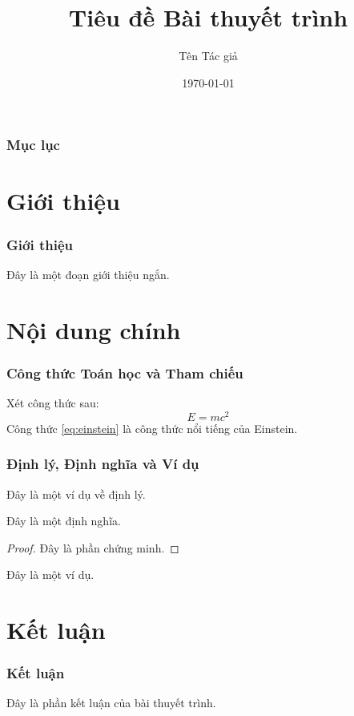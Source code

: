 \documentclass{beamer}
\begin{document}
\title{Tiêu đề Bài thuyết trình}
\author{Tên Tác giả}
\date{\today}

\begin{frame}
    \titlepage
\end{frame}

\begin{frame}
    \frametitle{Mục lục}
    \tableofcontents
\end{frame}

\section{Giới thiệu}

\begin{frame}
    \frametitle{Giới thiệu}
    Đây là một đoạn giới thiệu ngắn.
\end{frame}

\section{Nội dung chính}

\begin{frame}
    \frametitle{Công thức Toán học và Tham chiếu}
    Xét công thức sau:
    \begin{equation}
        E = mc^2
        \label{eq:einstein}
    \end{equation}
    Công thức \cref{eq:einstein} là công thức nổi tiếng của Einstein.
\end{frame}

\begin{frame}
    \frametitle{Định lý, Định nghĩa và Ví dụ}
    \begin{theorem}
        Đây là một ví dụ về định lý.
    \end{theorem}

    \begin{definition}
        Đây là một định nghĩa.
    \end{definition}

    \begin{proof}
        Đây là phần chứng minh.
    \end{proof}

    \begin{example}
        Đây là một ví dụ.
    \end{example}
\end{frame}

\section{Kết luận}

\begin{frame}
    \frametitle{Kết luận}
    Đây là phần kết luận của bài thuyết trình.
\end{frame}
\end{document}
